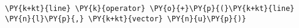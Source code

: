 \begin{Verbatim}[commandchars=\\\{\}]
    \PY{k+kt}{line} \PY{k}{operator} \PY{o}{+}\PY{p}{(}\PY{k+kt}{line} \PY{n}{l}\PY{p}{,} \PY{k+kt}{vector} \PY{n}{u}\PY{p}{)}
\end{Verbatim}

